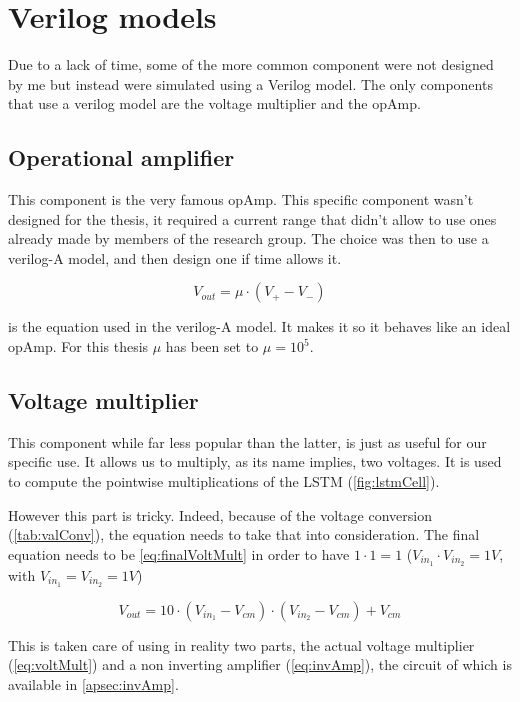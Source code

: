 \section{Verilog models}
\label{sec:models}

Due to a lack of time, some of the more common component were not designed by me but instead were simulated using a Verilog model. The only components that use a verilog model are the voltage multiplier and the \ac{opAmp}.

\subsection{Operational amplifier}

This component is the very famous \ac{opAmp}. This specific component wasn't designed for the thesis, it required a current range that didn't allow to use ones already made by members of the research group. The choice was then to use a verilog-A model, and then design one if time allows it.

\begin{equation}
  \label{eq:opAmp}
  V_{out}=\mu \cdot (V_+-V_-)
\end{equation}

 is the equation used in the verilog-A model. It makes it so it behaves like an ideal \ac{opAmp}. For this thesis $\mu$ has been set to $\mu=10^5$.

\subsection{Voltage multiplier}

This component while far less popular than the latter, is just as useful for our specific use. It allows us to multiply, as its name implies, two voltages. It is used to compute the pointwise multiplications of the \ac{LSTM} (\cref{fig:lstmCell}).

However this part is tricky. Indeed, because of the voltage conversion (\cref{tab:valConv}), the equation needs to take that into consideration. The final equation needs to be \cref{eq:finalVoltMult} in order to have $1\cdot 1=1$ ($V_{in_1}\cdot V_{in_2}=1V$, with $V_{in_1}=V_{in_2}=1V$)

\begin{equation}\label{eq:finalVoltMult}
  V_{out}=10\cdot(V_{in_1}-V_{cm})\cdot (V_{in_2}-V_{cm}) + V_{cm}
\end{equation}

This is taken care of using in reality two parts, the actual voltage multiplier (\cref{eq:voltMult}) and a non inverting amplifier (\cref{eq:invAmp}), the circuit of which is available in \cref{apsec:invAmp}.

